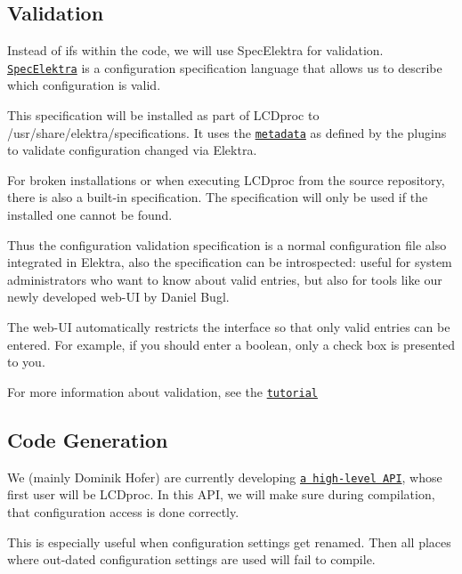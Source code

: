 \subsection*{Validation}

Instead of {\ttfamily if}s within the code, we will use Spec\+Elektra for validation. \href{https://www.libelektra.org/manpages/elektra-glossary}{\tt Spec\+Elektra} is a configuration specification language that allows us to describe which configuration is valid.

This specification will be installed as part of L\+C\+Dproc to {\ttfamily /usr/share/elektra/specifications}. It uses the \href{https://www.libelektra.org/docgettingstarted/metadata}{\tt metadata} as defined by the plugins to validate configuration changed via Elektra.

For broken installations or when executing L\+C\+Dproc from the source repository, there is also a built-\/in specification. The specification will only be used if the installed one cannot be found.

Thus the configuration validation specification is a normal configuration file also integrated in Elektra, also the specification can be introspected\+: useful for system administrators who want to know about valid entries, but also for tools like our newly developed web-\/\+UI by Daniel Bugl.

The web-\/\+UI automatically restricts the interface so that only valid entries can be entered. For example, if you should enter a boolean, only a check box is presented to you.


\begin{DoxyItemize}
\item For more information about validation, see the \href{https://www.libelektra.org/tutorials/validate-configuration}{\tt tutorial}
\end{DoxyItemize}

\subsection*{Code Generation}

We (mainly Dominik Hofer) are currently developing \href{https://www.libelektra.org/decisions/high-level-api}{\tt a high-\/level A\+PI}, whose first user will be L\+C\+Dproc. In this A\+PI, we will make sure during compilation, that configuration access is done correctly.

This is especially useful when configuration settings get renamed. Then all places where out-\/dated configuration settings are used will fail to compile.


